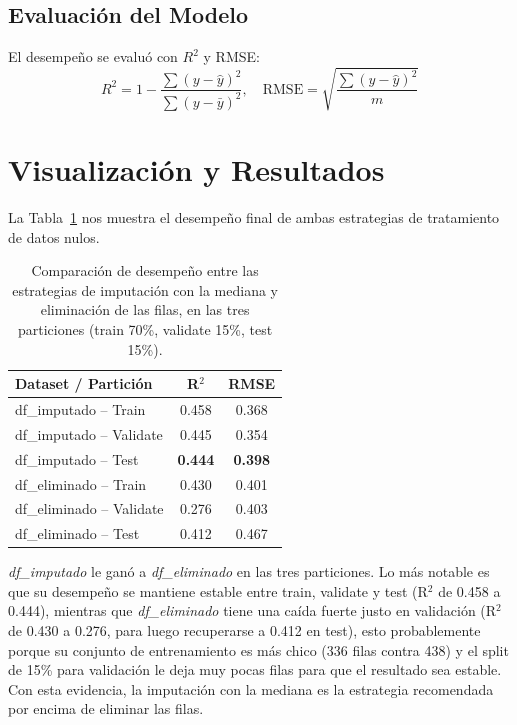 \documentclass[10pt,twocolumn]{article}
\begin{document}
\subsection{Evaluación del Modelo}

El desempeño se evaluó con $R^2$ y RMSE:
\begin{equation}
R^2 = 1 - \frac{\sum(y - \hat{y})^2}{\sum(y - \bar{y})^2}, \quad \text{RMSE} = \sqrt{\frac{\sum(y-\hat{y})^2}{m}}
\end{equation}

\section{Visualización y Resultados}

La Tabla~\ref{tab:resultados} nos muestra el desempeño final de ambas estrategias de tratamiento de datos nulos.

\begin{table}[h]
\centering
\small
\begin{tabular}{lcc}
\toprule
\textbf{Dataset / Partición} & \textbf{R$^2$} & \textbf{RMSE} \\
\midrule
df\_imputado -- Train      & 0.458 & 0.368 \\
df\_imputado -- Validate   & 0.445 & 0.354 \\
df\_imputado -- Test       & \textbf{0.444} & \textbf{0.398} \\
\midrule
df\_eliminado -- Train     & 0.430 & 0.401 \\
df\_eliminado -- Validate  & 0.276 & 0.403 \\
df\_eliminado -- Test      & 0.412 & 0.467 \\
\bottomrule
\end{tabular}
\caption{Comparación de desempeño entre las estrategias de imputación con la mediana y eliminación de las filas, en las tres particiones (train 70\%, validate 15\%, test 15\%).}
\label{tab:resultados}
\end{table}

\textit{df\_imputado} le ganó a \textit{df\_eliminado} en las tres particiones. Lo más notable es que su desempeño se mantiene estable entre train, validate y test (R$^2$ de 0.458 a 0.444), mientras que \textit{df\_eliminado} tiene una caída fuerte justo en validación (R$^2$ de 0.430 a 0.276, para luego recuperarse a 0.412 en test), esto probablemente porque su conjunto de entrenamiento es más chico (336 filas contra 438) y el split de 15\% para validación le deja muy pocas filas para que el resultado sea estable. Con esta evidencia, la imputación con la mediana es la estrategia recomendada por encima de eliminar las filas.
\end{document}
